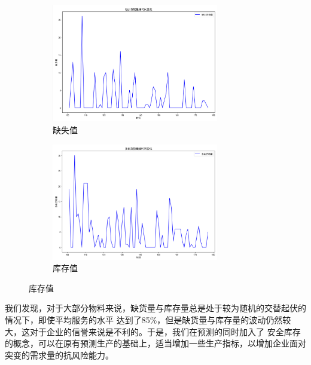 \documentclass{cumcmthesis}
\begin{document}
        \begin{figure}[ht]
            \centering
            \begin{subfigure}[b]{0.49\textwidth}
                \includegraphics[width=0.8\textwidth]{graph/graph_15.png}
                \caption{缺失值}
                \label{fig:image1}
            \end{subfigure}
            \hfill %
            \begin{subfigure}[b]{0.49\textwidth}
                \includegraphics[width=0.8\textwidth]{graph/graph_16.png}
                \caption{库存值}
                \label{fig:image2}
            \end{subfigure}
        \end{figure}

        我们发现，对于大部分物料来说，缺货量与库存量总是处于较为随机的交替起伏的情况下，即使平均服务的水平
        达到了85\%，但是缺货量与库存量的波动仍然较大，这对于企业的信誉来说是不利的。于是，我们在预测的同时加入了
        安全库存的概念，可以在原有预测生产的基础上，适当增加一些生产指标，以增加企业面对突变的需求量的抗风险能力。\\
\end{document}
